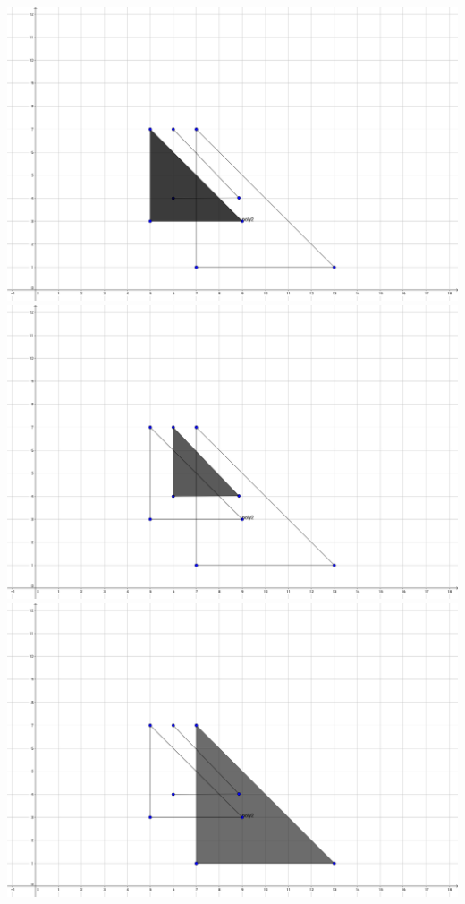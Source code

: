         \begin{center}
            \includegraphics[scale=0.1]{images/color1.png}
            \includegraphics[scale=0.1]{images/color2.png}
            \includegraphics[scale=0.1]{images/color4.png}
        \end{center}

